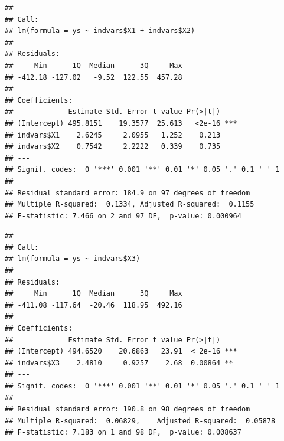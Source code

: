 \documentclass[
]{book}
\newenvironment{Shaded}{\begin{snugshade}}{\end{snugshade}}
\newcommand{\CommentTok}[1]{\textcolor[rgb]{0.56,0.35,0.01}{\textit{#1}}}
\newcommand{\FunctionTok}[1]{\textcolor[rgb]{0.13,0.29,0.53}{\textbf{#1}}}
\newcommand{\NormalTok}[1]{#1}
\newcommand{\OtherTok}[1]{\textcolor[rgb]{0.56,0.35,0.01}{#1}}
\newcommand{\SpecialCharTok}[1]{\textcolor[rgb]{0.81,0.36,0.00}{\textbf{#1}}}
\begin{document}
\begin{Shaded}
\end{Shaded}

\begin{verbatim}
## 
## Call:
## lm(formula = ys ~ indvars$X1 + indvars$X2)
## 
## Residuals:
##     Min      1Q  Median      3Q     Max 
## -412.18 -127.02   -9.52  122.55  457.28 
## 
## Coefficients:
##             Estimate Std. Error t value Pr(>|t|)    
## (Intercept) 495.8151    19.3577  25.613   <2e-16 ***
## indvars$X1    2.6245     2.0955   1.252    0.213    
## indvars$X2    0.7542     2.2222   0.339    0.735    
## ---
## Signif. codes:  0 '***' 0.001 '**' 0.01 '*' 0.05 '.' 0.1 ' ' 1
## 
## Residual standard error: 184.9 on 97 degrees of freedom
## Multiple R-squared:  0.1334, Adjusted R-squared:  0.1155 
## F-statistic: 7.466 on 2 and 97 DF,  p-value: 0.000964
\end{verbatim}

\begin{Shaded}
\end{Shaded}

\begin{verbatim}
## 
## Call:
## lm(formula = ys ~ indvars$X3)
## 
## Residuals:
##     Min      1Q  Median      3Q     Max 
## -411.08 -117.64  -20.46  118.95  492.16 
## 
## Coefficients:
##             Estimate Std. Error t value Pr(>|t|)    
## (Intercept) 494.6520    20.6863   23.91  < 2e-16 ***
## indvars$X3    2.4810     0.9257    2.68  0.00864 ** 
## ---
## Signif. codes:  0 '***' 0.001 '**' 0.01 '*' 0.05 '.' 0.1 ' ' 1
## 
## Residual standard error: 190.8 on 98 degrees of freedom
## Multiple R-squared:  0.06829,    Adjusted R-squared:  0.05878 
## F-statistic: 7.183 on 1 and 98 DF,  p-value: 0.008637
\end{verbatim}
\end{document}
